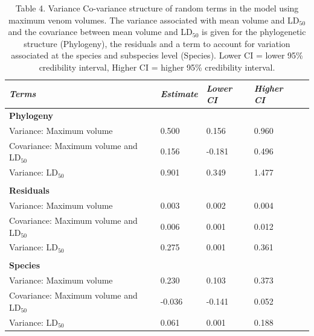 \begin{table}[H]
  \centering
    \caption*{Table 4. Variance Co-variance structure of random terms in the model using maximum venom volumes. The variance associated with mean volume and LD$_{50}$ and the covariance between mean volume and LD$_{50}$ is given for the phylogenetic structure (Phylogeny), the residuals and a term to account for variation associated at the species and subspecies level (Species). Lower CI = lower 95\% credibility interval, Higher CI = higher 95\% credibility interval.}
\begin{tabular}{*5l}    \toprule
\emph{Terms} & \emph{Estimate} & \emph{Lower CI} & \emph{Higher CI}\\\midrule
\textbf{Phylogeny} &   &   &  \\ 
Variance: Maximum volume & 0.500 & 0.156 & 0.960 \\
Covariance: Maximum volume and LD$_{50}$ & 0.156  & -0.181  & 0.496 \\
Variance: LD$_{50}$ & 0.901 & 0.349 & 1.477 \\

 &   &   &  \\

\textbf{Residuals} &   &   &  \\ 
Variance: Maximum volume & 0.003 & 0.002 & 0.004 \\
Covariance: Maximum volume and LD$_{50}$ & 0.006  & 0.001  & 0.012 \\
Variance: LD$_{50}$ & 0.275 & 0.001 & 0.361 \\

 &   &   &  \\ 

\textbf{Species} &   &   &  \\ 
Variance: Maximum volume & 0.230 & 0.103 & 0.373 \\
Covariance: Maximum volume and LD$_{50}$ & -0.036  & -0.141  & 0.052 \\
Variance: LD$_{50}$ & 0.061 & 0.001 & 0.188 \\\bottomrule
 \hline
\end{tabular}
  \label{tbl:Table 4.}
\end{table}


